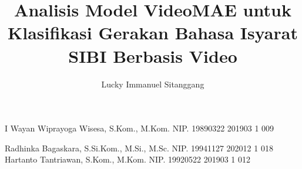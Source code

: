 \documentclass[article]{report} %
\begin{document}
    
    \title{Analisis Model VideoMAE untuk Klasifikasi Gerakan Bahasa Isyarat SIBI Berbasis Video}
    
	\author{Lucky Immanuel Sitanggang}		%
	
	\dosbingA%
		{I Wayan Wiprayoga Wisesa, S.Kom., M.Kom.}%
		{NIP. 19890322 201903 1 009}	%
		
	\pengujiA%
		{Radhinka Bagaskara, S.Si.Kom., M.Si., M.Sc.}%
		{NIP. 19941127 202012 1 018}	%
	\pengujiB%
		{Hartanto Tantriawan, S.Kom., M.Kom.}%
		{NIP. 19920522 201903 1 012}	%

	\sloppy %
    \setcounter{page}{1} %
\end{document}
